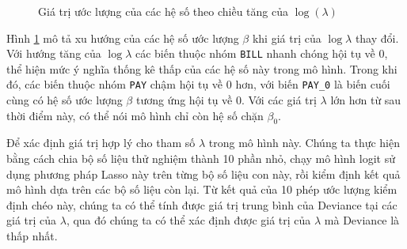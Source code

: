 \begin{figure}[h]
\centering
\capstart
\begin{knitrout}
\color{fgcolor}
\end{knitrout}
\caption{Giá trị ước lượng của các hệ số theo chiều tăng của $\log(\lambda)$}
\label{fig:lasso_coef}
\end{figure}

Hình \ref{fig:lasso_coef} mô tả xu hướng của các hệ số ước lượng $\beta$ khi giá trị của $\log\lambda$ thay đổi.
Với hướng tăng của $\log\lambda$ các biến thuộc nhóm \texttt{BILL} nhanh chóng hội tụ về $0$, thể hiện mức ý nghĩa thống kê thấp của các hệ số này trong mô hình. Trong khi đó, các biến thuộc nhóm \texttt{PAY} chậm hội tụ về $0$ hơn, với biến \texttt{PAY\_0} là biến cuối cùng có hệ số ước lượng $\beta$ tương ứng hội tụ về 0.
Với các giá trị $\lambda$ lớn hơn từ sau thời điểm này, có thể nói mô hình chỉ còn hệ số chặn $\beta_0$.

Để xác định giá trị hợp lý cho tham số $\lambda$ trong mô hình này. Chúng ta thực hiện bằng cách chia bộ số liệu thử nghiệm thành 10 phần nhỏ, chạy mô hình logit sử dụng phương pháp Lasso này trên từng bộ số liệu con này, rồi kiểm định kết quả mô hình dựa trên các bộ số liệu còn lại.
Từ kết quả của 10 phép ước lượng kiểm định chéo này, chúng ta có thể tính được giá trị trung bình của Deviance tại các giá trị của $\lambda$, qua đó chúng ta có thể xác định được giá trị của $\lambda$ mà Deviance là thấp nhất.

